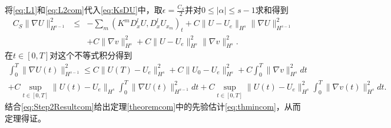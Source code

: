 将\eqref{eq:L1}和\eqref{eq:L2com}代入\eqref{eq:KsDU}中，取$\epsilon = \frac{C_S}{2}$并对$0 \le |\alpha| \le s-1$求和得到
\begin{eqnarray*}\label{eq:nablaUcom}
  C_S \|\nabla U\|_{H^{s-1}}^2 &\le& - \sum_{m} (K^m D^l_x U,D^l_x U_{x_m})_t  + C\|U-U_e\|_{H^s} \|\nabla U\|_{H^{s-1}}^2 \nonumber \\
  &&+ C \|\nabla  v \|_{H^s}^2+ C \|U-U_e\|_{H^s}^2 \|\nabla  v \|_{H^s}^2 .
\end{eqnarray*}
在$t \in [0,T]$对这个不等式积分得到
\begin{eqnarray*}
  \int_0^T \| \nabla U(t)\|_{H^{s-1}}^2 \le C \|U(T)-U_e \|_{H^s}^2 + C \|U_0 -U_e\|_{H^s}^2+ C\int_0^T \|\nabla  v \|_{H^s}^2 dt  \nonumber \\
  + C \sup_{t \in [0,T]} \|U(t)-U_e\|_{H^s} \int_0^T \|\nabla U(t)\|_{H^{s-1}}^2dt
  + C \sup_{t \in [0,T]} \|U(t)-U_e\|_{H^s}^2 \int_0^T\|\nabla  v (t)\|_{H^s}^2 dt. \nonumber
\end{eqnarray*}
结合\eqref{eq:Step2Resultcom}给出定理\ref{theoremcom}中的先验估计\eqref{eq:thmincom}，从而定理得证。




%
%


% 
% 


